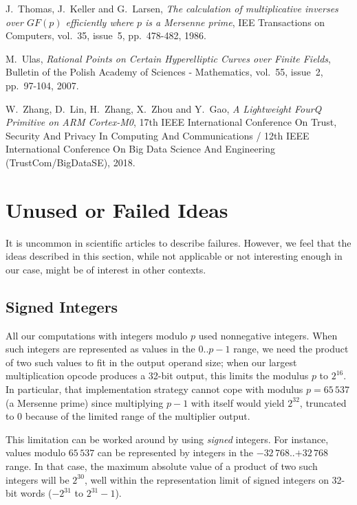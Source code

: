 \documentclass{llncs}
\newcommand{\GF}{GF}
\begin{document}
\begin{thebibliography}{20}
J.~Thomas, J.~Keller and G.~Larsen,
\emph{The calculation of multiplicative inverses over $\GF(p)$ efficiently
where $p$ is a Mersenne prime},
IEE Transactions on Computers, vol.~35, issue~5, pp.~478-482, 1986.

M.~Ulas,
\emph{Rational Points on Certain Hyperelliptic Curves over Finite Fields},
Bulletin of the Polish Academy of Sciences - Mathematics, vol.~55,
issue~2, pp.~97-104, 2007.

W.~Zhang, D.~Lin, H.~Zhang, X.~Zhou and Y.~Gao,
\emph{A Lightweight FourQ Primitive on ARM Cortex-M0},
17th IEEE International Conference On Trust, Security And Privacy In
Computing And Communications / 12th IEEE International Conference On
Big Data Science And Engineering (TrustCom/BigDataSE), 2018.

\end{thebibliography}

\appendix

\section{Unused or Failed Ideas}\label{sec:unused}

It is uncommon in scientific articles to describe failures. However, we
feel that the ideas described in this section, while not applicable or
not interesting enough in our case, might be of interest in other
contexts.

\subsection{Signed Integers}\label{sec:unused-signed}

All our computations with integers modulo $p$ used nonnegative integers.
When such integers are represented as values in the $0$..$p-1$ range, we
need the product of two such values to fit in the output operand size;
when our largest multiplication opcode produces a 32-bit output, this
limits the modulus $p$ to $2^{16}$. In particular, that implementation
strategy cannot cope with modulus $p = 65\,537$ (a Mersenne prime) since
multiplying $p-1$ with itself would yield $2^{32}$, truncated to $0$
because of the limited range of the multiplier output.

This limitation can be worked around by using \emph{signed} integers.
For instance, values modulo $65\,537$ can be represented by integers in
the $-32\,768$..$+32\,768$ range. In that case, the maximum absolute
value of a product of two such integers will be $2^{30}$, well within
the representation limit of signed integers on 32-bit words ($-2^{31}$
to $2^{31}-1$).
\end{document}
